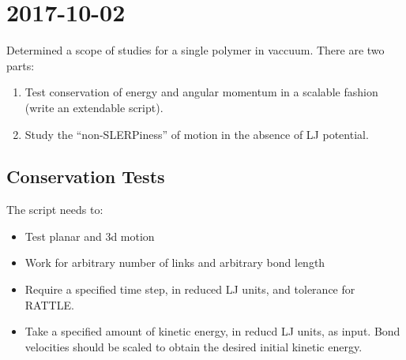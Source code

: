 \section{2017-10-02}\label{s:20171002}
\par Determined a scope of studies for a single polymer in vaccuum. There are two parts:
\begin{enumerate}
  \item Test conservation of energy and angular momentum in a scalable fashion (write an extendable script).
  \item Study the ``non-SLERPiness'' of motion in the absence of LJ potential.
\end{enumerate}
\subsection{Conservation Tests}
\par The script needs to:
\begin{itemize}
  \item Test planar and 3d motion
  \item Work for arbitrary number of links and arbitrary bond length
  \item Require a specified time step, in reduced LJ units, and tolerance for RATTLE.
  \item Take a specified amount of kinetic energy, in reducd LJ units, as input. Bond velocities should be scaled to obtain the desired initial kinetic energy.
\end{itemize}
